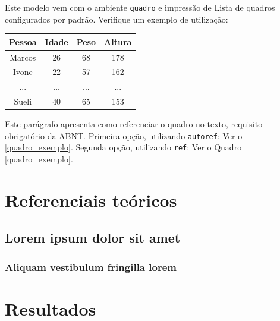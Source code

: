 \documentclass[
	12pt,				%
	openright,			%
	twoside,			%
	a4paper,			%
	english,			%
	french,				%
	spanish,			%
	brazil				%
	]{abntex2}
\begin{document}
Este modelo vem com o ambiente \texttt{quadro} e impressão de Lista de quadros 
configurados por padrão. Verifique um exemplo de utilização:

\begin{quadro}[htb]
\caption{\label{quadro_exemplo}Exemplo de quadro}
\begin{tabular}{|c|c|c|c|}
	\hline
	\textbf{Pessoa} & \textbf{Idade} & \textbf{Peso} & \textbf{Altura} \\ \hline
	Marcos & 26    & 68   & 178    \\ \hline
	Ivone  & 22    & 57   & 162    \\ \hline
	...    & ...   & ...  & ...    \\ \hline
	Sueli  & 40    & 65   & 153    \\ \hline
\end{tabular}
\end{quadro}

Este parágrafo apresenta como referenciar o quadro no texto, requisito
obrigatório da ABNT. 
Primeira opção, utilizando \texttt{autoref}: Ver o \autoref{quadro_exemplo}. 
Segunda opção, utilizando  \texttt{ref}: Ver o Quadro \ref{quadro_exemplo}.

\part{Referenciais teóricos}

\chapter{Lorem ipsum dolor sit amet}

\section{Aliquam vestibulum fringilla lorem}

\lipsum[1]

\lipsum[2-3]

\part{Resultados}
\end{document}

